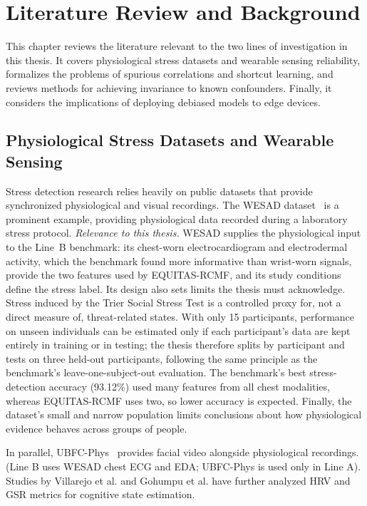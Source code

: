 ﻿\chapter{Literature Review and Background}
\label{ch:literature}

This chapter reviews the literature relevant to the two lines of investigation in this thesis. It covers physiological stress datasets and wearable sensing reliability, formalizes the problems of spurious correlations and shortcut learning, and reviews methods for achieving invariance to known confounders. Finally, it considers the implications of deploying debiased models to edge devices.

\section{Physiological Stress Datasets and Wearable Sensing}

Stress detection research relies heavily on public datasets that provide synchronized physiological and visual recordings. The WESAD dataset~\cite{schmidt2018} is a prominent example, providing physiological data recorded during a laboratory stress protocol.
\textit{Relevance to this thesis.} WESAD supplies the physiological input to the Line~B benchmark: its chest-worn electrocardiogram and electrodermal activity, which the benchmark found more informative than wrist-worn signals, provide the two features used by EQUITAS-RCMF, and its study conditions define the stress label. Its design also sets limits the thesis must acknowledge. Stress induced by the Trier Social Stress Test is a controlled proxy for, not a direct measure of, threat-related states. With only 15 participants, performance on unseen individuals can be estimated only if each participant's data are kept entirely in training or in testing; the thesis therefore splits by participant and tests on three held-out participants, following the same principle as the benchmark's leave-one-subject-out evaluation. The benchmark's best stress-detection accuracy (93.12\%) used many features from all chest modalities, whereas EQUITAS-RCMF uses two, so lower accuracy is expected. Finally, the dataset's small and narrow population limits conclusions about how physiological evidence behaves across groups of people.

In parallel, UBFC-Phys~\cite{sabour2023} provides facial video alongside physiological recordings. (Line B uses WESAD chest ECG and EDA; UBFC-Phys is used only in Line A). Studies by Villarejo et al. and Gohumpu et al. have further analyzed HRV and GSR metrics for cognitive state estimation.

